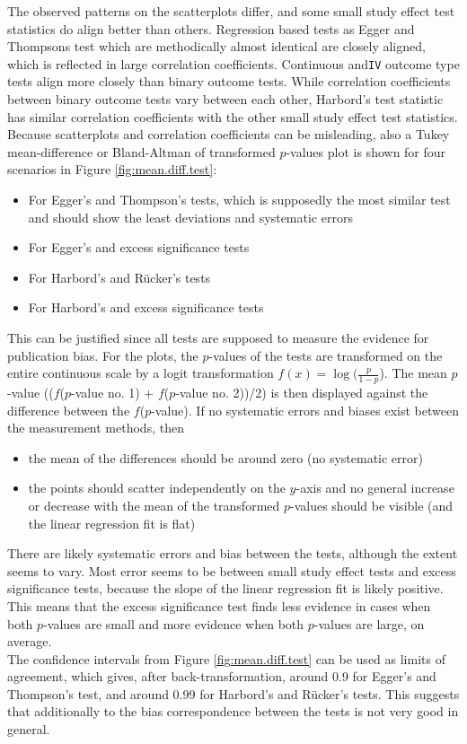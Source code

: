\documentclass[11pt,a4paper,twoside]{book}\usepackage[]{graphicx}\usepackage[]{color}
\begin{document}
The observed patterns on the scatterplots differ, and some small study effect test statistics do align better than others. Regression based tests as Egger and Thompsons test which are methodically almost identical are closely aligned, which is reflected in large correlation coefficients. Continuous and\texttt{IV} outcome type tests align more closely than binary outcome tests. While correlation coefficients between binary outcome tests vary between each other, Harbord's test statistic has similar correlation coefficients with the other small study effect test statistics.\\
Because scatterplots and correlation coefficients can be misleading, also a Tukey mean-difference or Bland-Altman of transformed $p$-values plot is shown for four scenarios in Figure \ref{fig:mean.diff.test}:
\begin{itemize}
\item For Egger's and Thompson's tests, which is supposedly the most similar test and should show the least deviations and systematic errors
\item For Egger's and excess significance tests
\item For Harbord's and R\"ucker's tests
\item For Harbord's and excess significance tests
\end{itemize}

This can be justified since all tests are supposed to measure the evidence for publication bias. For the plots, the $p$-values of the tests are transformed on the entire continuous scale by a logit transformation $f(x)  = \log(\frac{p}{1-p}$). The mean $p$-value (($f$($p$-value no. 1) + $f$($p$-value no. 2))/2) is then displayed against the difference between the $f$($p$-value). If no systematic errors and biases exist between the measurement methods, then 

\begin{itemize}
\item the mean of the differences should be around zero (no systematic error) 
\item the points should scatter independently on the $y$-axis and no general increase or decrease with the mean of the transformed $p$-values should be visible (and the linear regression fit is flat)
\end{itemize}

There are likely systematic errors and bias between the tests, although the extent seems to vary. Most error seems to be between small study effect tests and excess significance tests, because the slope of the linear regression fit is likely positive. This means that the excess significance test finds less evidence in cases when both $p$-values are small and more evidence when both $p$-values are large, on average.\\
The confidence intervals from Figure \ref{fig:mean.diff.test} can be used as limits of agreement, which gives, after back-transformation, around 0.9 for Egger's and Thompson's test, and around 0.99 for Harbord's and R\"ucker's tests. This suggests that additionally to the bias correspondence between the tests is not very good in general. 
\end{document}
